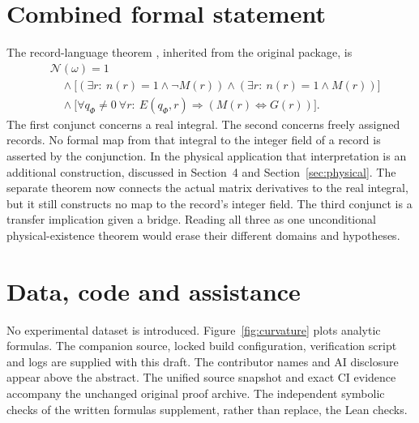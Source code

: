 \documentclass[11pt]{article}
\theoremstyle{definition}\newtheorem{definition}[theorem]{Definition}
\theoremstyle{remark}\newtheorem{remark}[theorem]{Remark}
\newcommand{\leanname}[1]{\texttt{\small\detokenize{#1}}}
\begin{document}
\section{Combined formal statement}
The record-language theorem \leanname{formal_stance}, inherited from the original package, is
\begin{align*}
 &\mathcal N(\omega)=1\\[-0.3em]
 &\quad\land\bigl[(\exists r:\ n(r)=1\land\neg M(r))
       \land(\exists r:\ n(r)=1\land M(r))\bigr]\\[-0.3em]
 &\quad\land\bigl[\forall q_\Phi\neq0\ \forall r:\
 E(q_\Phi,r)\Rightarrow(M(r)\Longleftrightarrow G(r))\bigr].
\end{align*}
The first conjunct concerns a real integral. The second concerns freely assigned records. No formal map from that integral to the integer field of a record is asserted by the conjunction. In the physical application that interpretation is an additional construction, discussed in Section~4 and Section~\ref{sec:physical}. The separate \leanname{matrix_to_integer} theorem now connects the actual matrix derivatives to the real integral, but it still constructs no map to the record's integer field. The third conjunct is a transfer implication given a bridge. Reading all three as one unconditional physical-existence theorem would erase their different domains and hypotheses.

\section*{Data, code and assistance}
No experimental dataset is introduced. Figure~\ref{fig:curvature} plots analytic formulas. The companion source, locked build configuration, verification script and logs are supplied with this draft. The contributor names and AI disclosure appear above the abstract. The unified source snapshot and exact CI evidence accompany the unchanged original proof archive. The independent symbolic checks of the written formulas supplement, rather than replace, the Lean checks.
\end{document}
